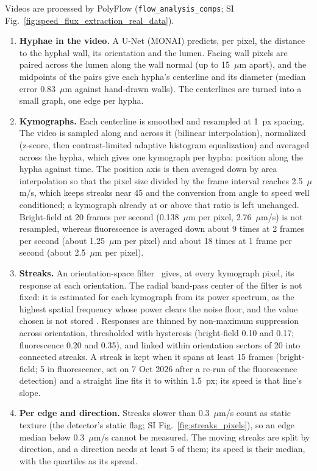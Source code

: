 Videos are processed by PolyFlow (\texttt{flow\_analysis\_comps}; SI Fig.~\ref{fig:speed_flux_extraction_real_data}).
\begin{enumerate}
  \item \textbf{Hyphae in the video.}
A U-Net (MONAI) predicts, per pixel, the distance to the hyphal wall, its orientation and the lumen.
Facing wall pixels are paired across the lumen along the wall normal (up to 15~$\mu$m apart), and the midpoints of the pairs give each hypha's centerline and its diameter (median error 0.83~$\mu$m against hand-drawn walls).
The centerlines are turned into a small graph, one edge per hypha.
  \item \textbf{Kymographs.}
Each centerline is smoothed and resampled at 1~px spacing.
The video is sampled along and across it (bilinear interpolation), normalized (z-score, then contrast-limited adaptive histogram equalization) and averaged across the hypha, which gives one kymograph per hypha: position along the hypha against time.
The position axis is then averaged down by area interpolation so that the pixel size divided by the frame interval reaches 2.5~$\mu$m/s, which keeps streaks near 45\textdegree{} and the conversion from angle to speed well conditioned; a kymograph already at or above that ratio is left unchanged.
Bright-field at 20 frames per second (0.138~$\mu$m per pixel, 2.76~$\mu$m/s) is not resampled, whereas fluorescence is averaged down about 9 times at 2 frames per second (about 1.25~$\mu$m per pixel) and about 18 times at 1 frame per second (about 2.5~$\mu$m per pixel).
  \item \textbf{Streaks.}
An orientation-space filter~\cite{kittisopikulAdaptiveMultiorientationResolution2020} gives, at every kymograph pixel, its response at each orientation.
The radial band-pass center of the filter is not fixed: it is estimated for each kymograph from its power spectrum, as the highest spatial frequency whose power clears the noise floor, and the value chosen is not stored .
Responses are thinned by non-maximum suppression across orientation, thresholded with hysteresis (bright-field 0.10 and 0.17; fluorescence 0.20 and 0.35), and linked within orientation sectors of 20\textdegree{} into connected streaks.
A streak is kept when it spans at least 15 frames (bright-field; 5 in fluorescence, set on 7 Oct 2026 after a re-run of the fluorescence detection) and a straight line fits it to within 1.5~px; its speed is that line's slope.
  \item \textbf{Per edge and direction.}
Streaks slower than 0.3~$\mu$m/s count as static texture (the detector's static flag; SI Fig.~\ref{fig:streaks_pixels}), so an edge median below 0.3~$\mu$m/s cannot be measured.
The moving streaks are split by direction, and a direction needs at least 5 of them; its speed is their median, with the quartiles as its spread.
\end{enumerate}

